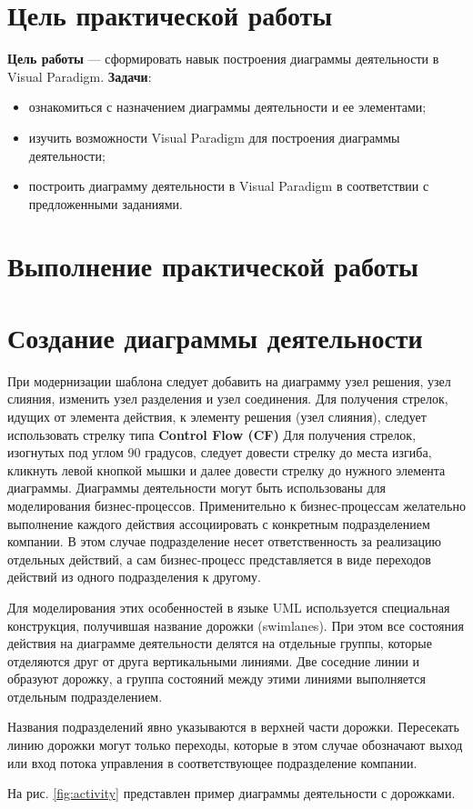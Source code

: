 \graphicspath{{./img}} %

\section*{\LARGE Цель практической работы}

\textbf{Цель работы} --- сформировать навык построения диаграммы
деятельности в Visual Paradigm.
\textbf{Задачи}:
\begin{itemize}
	\item ознакомиться с назначением диаграммы деятельности и ее элементами;
	\item изучить возможности Visual Paradigm для построения
		диаграммы деятельности;
	\item построить диаграмму деятельности в Visual Paradigm
		в соответствии с предложенными заданиями.
\end{itemize}

\clearpage

\section*{\LARGE Выполнение практической работы}
\section{Создание диаграммы деятельности}
При модернизации шаблона следует добавить на диаграмму узел решения,
узел слияния, изменить узел разделения и узел соединения. Для получения
стрелок, идущих от элемента действия, к элементу решения (узел слияния),
следует использовать стрелку типа \textbf{Control Flow (CF)} Для получения
стрелок, изогнутых под углом 90 градусов, следует довести стрелку до места
изгиба, кликнуть левой кнопкой мышки и далее довести стрелку до нужного
элемента диаграммы. Диаграммы деятельности могут быть использованы для
моделирования бизнес-процессов. Применительно к бизнес-процессам
желательно выполнение каждого действия ассоциировать с конкретным
подразделением компании. В этом случае подразделение несет ответственность
за реализацию отдельных действий, а сам бизнес-процесс представляется в виде
переходов действий из одного подразделения к другому.\par
Для моделирования этих особенностей в языке UML используется
специальная конструкция, получившая название дорожки (swimlanes). При этом
все состояния действия на диаграмме деятельности делятся на отдельные
группы, которые отделяются друг от друга вертикальными линиями. Две
соседние линии и образуют дорожку, а группа состояний между этими линиями
выполняется отдельным подразделением.\par
Названия подразделений явно указываются в верхней части дорожки.
Пересекать линию дорожки могут только переходы, которые в этом случае
обозначают выход или вход потока управления в соответствующее
подразделение компании.\par
На рис. \ref{fig:activity} представлен пример диаграммы деятельности
с дорожками.

